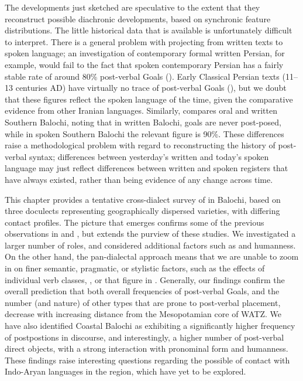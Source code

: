 \documentclass[output=paper,colorlinks,citecolor=brown,draftmode]{langscibook}
\begin{document}
The developments just sketched are speculative to the extent that they reconstruct possible diachronic developments, based on synchronic feature distributions. The little historical data that is available is unfortunately difficult to interpret. There is a general problem with projecting from written texts to spoken language; an investigation of contemporary formal written Persian, for example, would fail to  the fact that spoken contemporary Persian has a fairly stable rate of around 80\% post-verbal Goals (). Early Classical Persian texts (11--13 centuries AD) have virtually no trace of post-verbal Goals (), but we doubt that these figures reflect the spoken language of the time, given the comparative evidence from other Iranian languages. Similarly, \citet{Jahani2018Post-verbal} compares oral and written Southern Balochi, noting that in written Balochi, goals are never post-posed, while in spoken Southern Balochi the relevant figure is 90\%. These differences raise a methodological problem with regard to reconstructing the history of post-verbal syntax; differences between yesterday's written and today's spoken language may just reflect differences between written and spoken registers that have always existed, rather than being evidence of any change across time.

This chapter provides a tentative cross-dialect survey of  in Balochi, based on three doculects representing geographically dispersed varieties, with differing contact profiles. The picture that emerges confirms some of the previous observations in \citet{Jahani2018Post-verbal} and \citet{Korn2022Targets}, but extends the purview of these studies. We investigated a larger number of roles, and considered additional factors such as  and humanness. On the other hand, the pan-dialectal approach means that we are unable to zoom in on finer semantic, pragmatic, or stylistic factors, such as the effects of individual verb classes, , or  that figure in \citet{Korn2022Targets}. 
Generally, our findings confirm the overall prediction that both overall frequencies of post-verbal Goals, and the number (and nature) of other  types that are prone to post-verbal placement, decrease with increasing distance from the Mesopotamian core of WATZ. We have also identified Coastal Balochi as exhibiting a significantly higher frequency of postpostions in discourse, and interestingly, a higher number of post-verbal direct objects, with a strong interaction with pronominal form and humanness. These findings raise interesting questions regarding the possible  of contact with Indo-Aryan languages in the region, which have yet to be explored.
\end{document}
